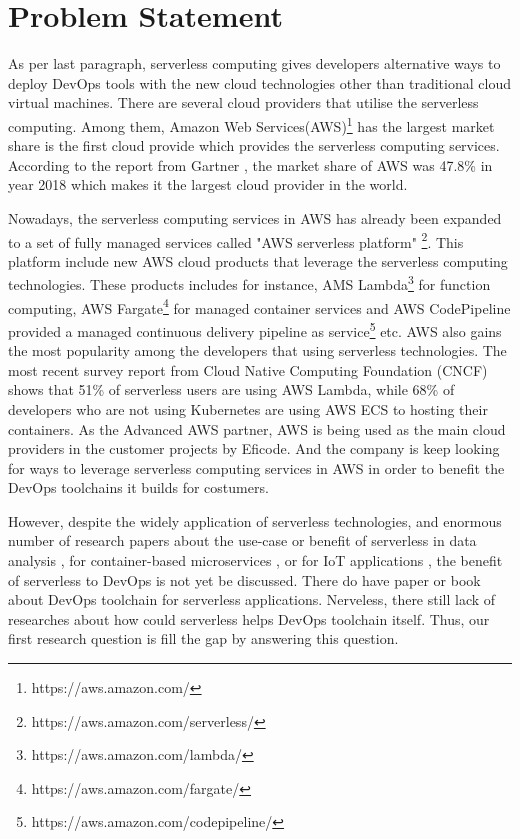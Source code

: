 \section{Problem Statement}
As per last paragraph, serverless computing gives developers alternative ways to deploy DevOps tools with the new cloud technologies other than traditional cloud virtual machines. There are several cloud providers that utilise the serverless computing. Among them, Amazon Web Services(AWS)\footnote{https://aws.amazon.com/} has the largest market share is the first cloud provide which provides the serverless computing services. According to the report from Gartner \cite{GartnerS47:online}, the market share of AWS was 47.8\% in year 2018 which makes it the largest cloud provider in the world.
\par
Nowadays, the serverless computing services in AWS has already been expanded to a set of fully managed services called "AWS serverless platform" \footnote{https://aws.amazon.com/serverless/}. This platform include new AWS cloud products that leverage the serverless computing technologies. These products includes for instance, AMS Lambda\footnote{https://aws.amazon.com/lambda/} for function computing, AWS Fargate\footnote{https://aws.amazon.com/fargate/} for managed container services and AWS CodePipeline provided a managed continuous delivery pipeline as service\footnote{https://aws.amazon.com/codepipeline/} etc. 
AWS also gains the most popularity among the developers that using serverless technologies. The most recent survey report \cite{cncf2020} from Cloud Native Computing Foundation (CNCF) shows that 51\% of serverless users are using AWS Lambda, while 68\% of developers who are not using Kubernetes are using AWS ECS to hosting their containers.
As the Advanced AWS partner, AWS is being used as the main cloud providers in the customer projects by Eficode. And the company is keep looking for ways to leverage serverless computing services in AWS in order to benefit the DevOps toolchains it builds for costumers.
\par
However, despite the widely application of serverless technologies, and enormous number of research papers about the use-case or benefit of serverless in data analysis \cite{8457831}, for container-based microservices \cite{perez2018serverless}, or for IoT applications \cite{nastic2017serverless} \cite{glikson2017deviceless}, the benefit of serverless to DevOps is not yet be discussed. There do have paper \cite{ivanov2018implementation} or book \cite{bangera2018devops} about DevOps toolchain for serverless applications. Nerveless, there still lack of researches about how could serverless helps DevOps toolchain itself. Thus, our first research question is fill the gap by answering this question. 
